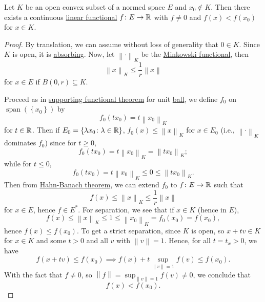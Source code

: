 \begin{theorem}\label{thm:separation-of-a-point-from-a-convex-set}
	Let \(K\) be an open convex subset of a normed space \(E\) and \(x_0 \notin K\). Then there exists a continuous \hyperref[def:linear-functional]{linear functional} \(f\colon E\to \mathbb{\MakeUppercase{r}} \) with \(f\neq 0\) and \(f(x) < f(x_0)\) for \(x\in K\).
\end{theorem}
\begin{proof}
	By translation, we can assume without loss of generality that \(0\in K\). Since \(K\) is open, it is \hyperref[def:absorbing]{absorbing}. Now, let \(\left\lVert \cdot\right\rVert _K\) be the \hyperref[def:Minkowski-functional]{Minkowski functional}, then
	\[
		\left\lVert x\right\rVert _K \leq \frac{1}{r}\left\lVert x\right\rVert
	\]
	for \(x\in E\) if \(B(0, r)\subseteq K\).
	\begin{center}
	\end{center}
	Proceed as in \hyperref[thm:supporting-functional]{supporting functional theorem} for unit \hyperref[def:ball]{ball}, we define \(f_0\) on \(\mathop{\mathrm{span}}(\left\{ x_0 \right\} )\) by
	\[
		f_0(tx_0) = t\left\lVert x_0\right\rVert_K
	\]
	for \(t\in \mathbb{\MakeUppercase{r}} \). Then if \(E_0 = \left\{ \lambda x_0 \colon \lambda \in \mathbb{\MakeUppercase{r}}  \right\} \), \(f_0 (x) \leq \left\lVert x\right\rVert _K\) for \(x\in E_0\) (i.e., \(\left\lVert \cdot\right\rVert _K\) dominates \(f_0\)) since for \(t \geq 0\),
	\[
		f_0 (tx_0) = t \left\lVert x_0\right\rVert _K= \left\lVert t x_0\right\rVert_K;
	\]
	while for \(t \leq 0\),
	\[
		f_0 ( tx_0) = t\left\lVert x_0\right\rVert_K \leq 0\leq \left\lVert t x_0\right\rVert _K.
	\]
	Then from \hyperref[thm:Hahn-Banach]{Hahn-Banach theorem}, we can extend \(f_0\) to \(f\colon E\to \mathbb{\MakeUppercase{r}} \) such that
	\[
		f(x) \leq \left\lVert x\right\rVert _K \leq \frac{1}{r} \left\lVert x\right\rVert
	\]
	for \(x\in E\), hence \(f\in E^{\ast} \). For separation, we see that if \(x\in K\) (hence in \(E\)),
	\[
		f(x) \leq \left\lVert x\right\rVert _K \leq 1 \leq \left\lVert x_0\right\rVert _K = f_0 (x_0) = f(x_0),
	\]
	hence \(f(x) \leq f(x_0)\). To get a strict separation, since \(K\) is open, so \(x + tv\in K\) for \(x\in K\) and some \(t > 0\) and all \(v\) with \(\left\lVert v\right\rVert = 1\). Hence, for all \(t = t_x > 0\), we have
	\[
		f(x + tv) \leq f(x_0) \implies f(x) + t \sup _{\left\lVert v\right\rVert = 1}f(v) \leq f(x_0).
	\]
	With the fact that \(f\neq 0\), so \(\left\lVert f\right\rVert = \sup _{\left\lVert v\right\rVert = 1}f(v) \neq 0\), we conclude that
	\[
		f(x) < f(x_0).
	\]
\end{proof}

